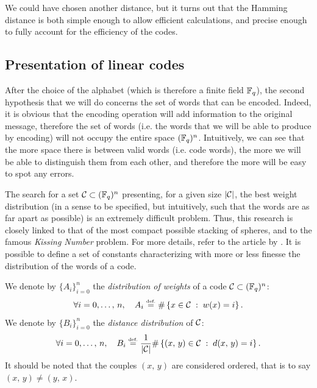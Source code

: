 We could have chosen another distance, but it turns out that the Hamming distance is both simple enough to allow efficient calculations, and precise enough to fully account for the efficiency of the codes.
\subsection{Presentation of linear codes}
\label{sect2-presentation-cyclic-codes}
 
 
   After the choice of the alphabet (which is therefore a finite field $ \mathbb{F}_q $), the second hypothesis that we will do concerns the set of words that can be encoded. Indeed, it is obvious that the encoding operation will add information to the original message, therefore the set of  words (i.e. the words that we will be able to produce by encoding) will not occupy the entire space $ (\mathbb{F}_q)^n $. Intuitively, we can see that the more space there is between valid words (i.e. code words), the more we will be able to distinguish them from each other, and therefore the more will be easy to spot any errors.
 
 
 The search for a set $ \mathcal{C} \subset (\mathbb{F}_q)^n $ presenting, for a given size $ | \mathcal{C} | $, the best weight distribution (in a sense to be specified, but intuitively, such that the words are as far apart as possible) is an extremely difficult problem. Thus, this research is closely linked to that of the most compact possible stacking of spheres, and to the famous \textit{Kissing Number} problem. For more details, refer to the article by  \cite{elkies-ams-1}. It is possible to define a set of constants characterizing with more or less finesse the distribution of the words of a code.
 
\begin{defn}
  \label{notation-68} We denote by $ \{A_i\}_{i = 0}^n $ the \textit{distribution of weights} of a code $ \mathcal{C} \subset (\mathbb{F}_q)^n $:
\begin{equation}
\label{eq-defn-weight-distribution}
\forall i = 0, \ldots, \, n, \quad A_i \stackrel{\mbox{\upshape\tiny def.}}{=} \# \left\{ x \in \mathcal{C} \;:\; w (x) = i \right\}.
\end{equation}
We denote by $ \{B_i\}_{i = 0}^n $ the \textit{distance distribution} of $ \mathcal{C} $:
\begin{equation}
\label{eq-defn-repartition-distance}
\forall i = 0, \ldots, \, n, \quad B_i \stackrel{\mbox{\upshape\tiny def.}}{=} \frac{1}{| \mathcal{C} |} \# \left\{ (x, \, y) \in \mathcal{C} \;:\; d (x , \, y) = i \right\}.
\end{equation}
It should be noted that the couples $ (x, \, y) $ are considered ordered, that is to say $ (x, \, y) \neq (y, \, x) $.
\end{defn}
 
